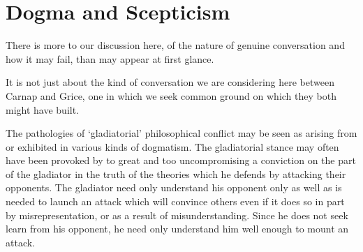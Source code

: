 \documentclass[10pt,titlepage]{book}
\newcommand{\ignore}[1]{}
\begin{document}
\ignore{

It is my perception, that in philosophical discussion on the Internet, it is very difficult to achieve what I have called a conversational dialogue.
It is the norm rather than the exception that people from the first assume that they understand what you are saying, and one may then find many occasions to complain that an adversary criticises a position that one has never held.

This is however, not a problem exclusive to the Internet fringe.
It is pervasive in the writings of professional philosophers that a philosopher will criticise an opponent by attacking a position which he has never held.
If the philosopher is at the van of a new philosophical trend this can be done with impunity, readers sympathetic to the new philosophical trend will not trouble to check the accuracy of the picture presented of some obsolescent point of view.

Sometimes a failure to converse is not due to bad faith.
Two philosophers earnestly wishing to understand each other may nevertheless fail for reasons which are mysterious and may possibly be insurmountable, and we shall touch upon some of these.

The point of this little diatribe is to explain that one of our aims in discussing Carnap and Grice here is to explore whether they might have had a conversation, and whether some of the ideas of metaphysical positivism might help in providing a basis for that dialogue.
To say some things on either side which might help to make conversation possible.
Locating the points at which incomprehension, may possibly facilitate their isolation, and permit conversation elsewhere.

}%


\section{Dogma and Scepticism}

There is more to our discussion here, of the nature of genuine conversation and how it may fail, than may appear at first glance.

It is not just about the kind of conversation we are considering here between Carnap and Grice, one in which we seek common ground on which they both might have built.

The pathologies of `gladiatorial' philosophical conflict may be seen as arising from or exhibited in various kinds of dogmatism.
The gladiatorial stance may often have been provoked by to great and too uncompromising a conviction on the part of the gladiator in the truth of the theories which he defends by attacking their opponents.
The gladiator need only understand his opponent only as well as is needed to launch an attack which will convince others even if it does so in part by misrepresentation, or as a result of misunderstanding.
Since he does not seek learn from his opponent, he need only understand him well enough to mount an attack.
\end{document}
